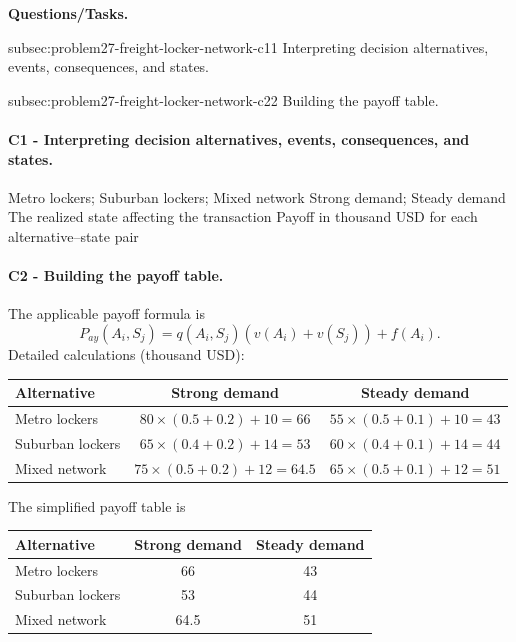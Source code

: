 	\textbf{Questions/Tasks.}
	\begin{enumerate}
	\CriterionTask
	{subsec:problem27-freight-locker-network-c1}{1}
	{Interpreting decision alternatives, events, consequences, and states.}

	\CriterionTask
	{subsec:problem27-freight-locker-network-c2}{2}
	{Building the payoff table.}
	\end{enumerate}

	\paragraph*{C1 - Interpreting decision alternatives, events, consequences, and states.}
	\label{subsec:problem27-freight-locker-network-c1}
	\DecisionElementsTable
	{Metro lockers; Suburban lockers; Mixed network}
	{Strong demand; Steady demand}
	{The realized state affecting the transaction}
	{Payoff in thousand USD for each alternative--state pair}

	\paragraph*{C2 - Building the payoff table.}
	\label{subsec:problem27-freight-locker-network-c2}
	The applicable payoff formula is
	\[ P_{ay}(A_i,S_j)=q(A_i,S_j)\left(v(A_i)+v(S_j)\right)+f(A_i). \]
	Detailed calculations (thousand USD):
	\begin{center}\small
	\begin{tabular}{lcc}
	\toprule
	Alternative & Strong demand & Steady demand \\
	\midrule
	Metro lockers & $80\times(0.5+0.2)+10=66$ & $55\times(0.5+0.1)+10=43$ \\
Suburban lockers & $65\times(0.4+0.2)+14=53$ & $60\times(0.4+0.1)+14=44$ \\
Mixed network & $75\times(0.5+0.2)+12=64.5$ & $65\times(0.5+0.1)+12=51$ \\
	\bottomrule
	\end{tabular}
	\end{center}
	The simplified payoff table is
	\begin{center}
	\begin{tabular}{lcc}
	\toprule
	Alternative & Strong demand & Steady demand \\
	\midrule
	Metro lockers & 66 & 43 \\
Suburban lockers & 53 & 44 \\
Mixed network & 64.5 & 51 \\
	\bottomrule
	\end{tabular}
	\end{center}

